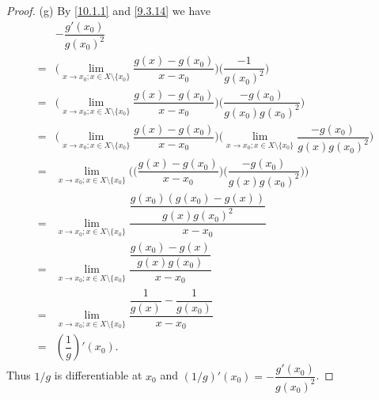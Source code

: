 \begin{proof}{(g)}
  By \cref{10.1.1} and \cref{9.3.14} we have
  \begin{align*}
      & -\dfrac{g'(x_0)}{g(x_0)^2}                                                                                                                                                      \\
    = & \bigg(\lim_{x \to x_0 ; x \in X \setminus \{x_0\}} \dfrac{g(x) - g(x_0)}{x - x_0}\bigg) \bigg(\dfrac{-1}{g(x_0)^2}\bigg)                                                        \\
    = & \bigg(\lim_{x \to x_0 ; x \in X \setminus \{x_0\}} \dfrac{g(x) - g(x_0)}{x - x_0}\bigg) \bigg(\dfrac{-g(x_0)}{g(x_0) g(x_0)^2}\bigg)                                            \\
    = & \bigg(\lim_{x \to x_0 ; x \in X \setminus \{x_0\}} \dfrac{g(x) - g(x_0)}{x - x_0}\bigg) \bigg(\lim_{x \to x_0 ; x \in X \setminus \{x_0\}} \dfrac{-g(x_0)}{g(x) g(x_0)^2}\bigg) \\
    = & \lim_{x \to x_0 ; x \in X \setminus \{x_0\}} \Bigg(\bigg(\dfrac{g(x) - g(x_0)}{x - x_0}\bigg) \bigg(\dfrac{-g(x_0)}{g(x) g(x_0)^2}\bigg)\Bigg)                                  \\
    = & \lim_{x \to x_0 ; x \in X \setminus \{x_0\}} \dfrac{\dfrac{g(x_0)(g(x_0) - g(x))}{g(x) g(x_0)^2}}{x - x_0}                                                                      \\
    = & \lim_{x \to x_0 ; x \in X \setminus \{x_0\}} \dfrac{\dfrac{g(x_0) - g(x)}{g(x) g(x_0)}}{x - x_0}                                                                                \\
    = & \lim_{x \to x_0 ; x \in X \setminus \{x_0\}} \dfrac{\dfrac{1}{g(x)} - \dfrac{1}{g(x_0)}}{x - x_0}                                                                               \\
    = & (\dfrac{1}{g})'(x_0).
  \end{align*}
  Thus \(1 / g\) is differentiable at \(x_0\) and \((1 / g)'(x_0) = -\dfrac{g'(x_0)}{g(x_0)^2}\).
\end{proof}

